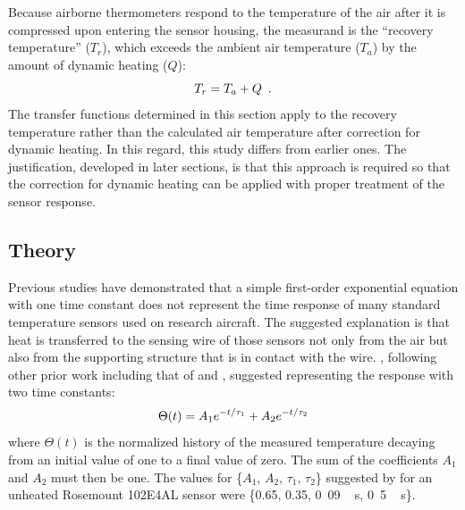 \documentclass[amt, manuscript]{copernicus}
\begin{document}
Because airborne thermometers respond to the temperature of the air
after it is compressed upon entering the sensor housing, the measurand
is the ``recovery temperature'' (\(T_{r}\)), which exceeds the ambient
air temperature (\(T_{a}\)) by the amount of dynamic heating (\(Q\)):
\begin{equation}
T_{r}=T_{a}+Q\,\,\,.{\label{eq:recoveryTemperature}}
\end{equation} The transfer functions determined in this section apply
to the recovery temperature rather than the calculated air temperature
after correction for dynamic heating. In this regard, this study differs
from earlier ones. The justification, developed in later sections, is
that this approach is required so that the correction for dynamic
heating can be applied with proper treatment of the sensor response.

\subsection{\texorpdfstring{Theory \label{subsec:Theory}}{Theory }}

Previous studies have demonstrated that a simple first-order exponential
equation with one time constant does not represent the time response of
many standard temperature sensors used on research aircraft. The
suggested explanation \citep{NCAR_OpenSky_TECH-NOTE-000-000-000-064} is
that heat is transferred to the sensing wire of those sensors not only
from the air but also from the supporting structure that is in contact
with the wire. \citet{FrieheKhelif1992}, following other prior work
including that of \citet{rodi1972analysis} and
\citet{mccarthy1973method}, suggested representing the response with two
time constants:
\begin{equation}\Theta(t)=A_{1}e^{-t/\tau_{1}}+A_{2}e^{-t/\tau_{2}}{\label{eq:FrieheKhelif}}
\end{equation} where \(\Theta(t)\) is the normalized history of the
measured temperature decaying from an initial value of one to a final
value of zero. The sum of the coefficients \(A_{1}\) and \(A_{2}\) must
then be one. The values for \{\(A_{1},\,A_{2},\,\tau_{1},\,\tau_{2}\)\}
suggested by \citet{FrieheKhelif1992} for an unheated Rosemount 102E4AL
sensor were \{0.65, 0.35, \unit{0.09\,s}, \unit{0.5\,s}\}.
\end{document}

